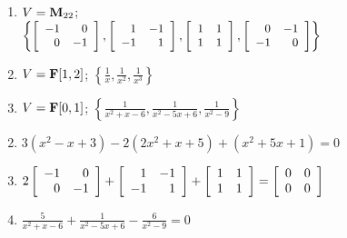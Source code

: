 \begin{multicols}{2}
\begin{ex}
\begin{enumerate}[label={\alph*.}]
\item $V = \textbf{M}_{22}$; \\
\hspace*{-2.5em}$\small{\left\{
\left[\begin{array}{rr}
	-1 & 0 \\
	0 & -1
\end{array} \right],
\left[\begin{array}{rr}
	1 & -1 \\
	-1 & 1
\end{array} \right],
\left[\begin{array}{rr}
	1 & 1 \\
	1 & 1
\end{array} \right],
\left[\begin{array}{rr}
	0 & -1 \\
	-1 & 0
\end{array} \right]\right\}}$

\item $V = \textbf{F}[1, 2]$; $\left\{\frac{1}{x}, \frac{1}{x^2}, \frac{1}{x^3} \right\}$

\item $V = \textbf{F}[0, 1]$; $\left\{\frac{1}{x^2 + x - 6}, \frac{1}{x^2 - 5x + 6}, \frac{1}{x^2 -9} \right\}$

\end{enumerate}
\begin{sol}
\begin{enumerate}[label={\alph*.}]
\setcounter{enumi}{1}
\item  $3(x^{2} - x + 3) - 2(2x^{2} + x + 5) + (x^{2} + 5x + 1) = 0$

\setcounter{enumi}{3}
\item $2 
\left[ \begin{array}{rr}
-1 & 0 \\
0 & -1
\end{array} \right]
+
\left[ \begin{array}{rr}
1 & -1 \\
-1 & 1
\end{array} \right]
+
\left[ \begin{array}{rr}
1 & 1 \\
1 & 1
\end{array} \right]
= \left[ \begin{array}{rr}
0 & 0 \\
0 & 0
\end{array} \right]$

\setcounter{enumi}{5}
\item $\frac{5}{x^2 + x - 6} + \frac{1}{x^2 - 5x + 6} - \frac{6}{x^2 - 9} = 0$


\end{enumerate}
\end{sol}
\end{ex}
\end{multicols}
